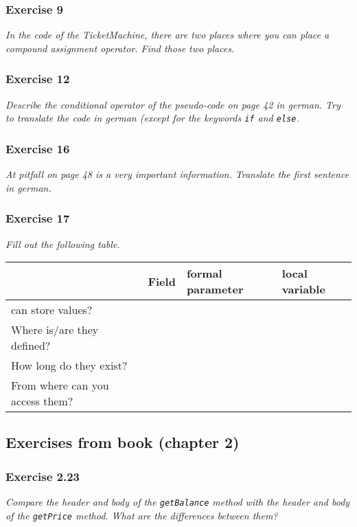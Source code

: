 \subsubsection*{Exercise 9}
\textit{In the code of the TicketMachine, there are two places where you
	can place a compound assignment operator. Find those two 
	places.}\\

\subsubsection*{Exercise 12}
\textit{Describe the conditional operator of the pseudo-code on page 42
	in german. Try to translate the code in german (except for the keywords
	\lstinline{if} and \lstinline{else}.}\\

\subsubsection*{Exercise 16}
\textit{At pitfall on page 48 is a very important information.
	Translate the first sentence in german.}\\

\subsubsection*{Exercise 17}
\textit{Fill out the following table.}\\

\begin{table}
	\centering
	\begin{tabular}{l | l | l | l}
			& \textbf{Field} 
				& \textbf{formal parameter} 
					& \textbf{local variable} \\
		\hline
		can store values? 
			&
				&
					& \\
		Where is/are they defined?
			&
				&
					& \\
		How long do they exist?
			&
				&
					& \\
		From where can you access them?
			&
				&
					& 
	\end{tabular}
\end{table}

\subsection{Exercises from book (chapter 2)}
\subsubsection*{Exercise 2.23}
\textit{Compare the header and body of the \lstinline?getBalance? method with 
the header and body of the \lstinline?getPrice? method. What are the 
differences between them? }

